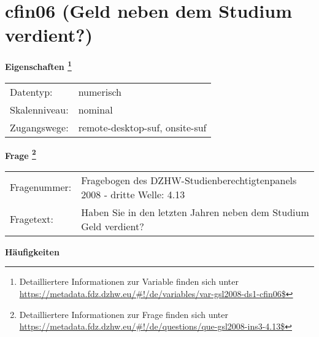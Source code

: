 
    \setcounter{footnote}{0}

    \vspace*{-1.8cm}
	\section{cfin06 (Geld neben dem Studium verdient?)}
	\label{section:cfin06}



    \vspace*{0.5cm}
    \noindent\textbf{Eigenschaften
	\footnote{Detailliertere Informationen zur Variable finden sich unter
		\url{https://metadata.fdz.dzhw.eu/\#!/de/variables/var-gsl2008-ds1-cfin06$}}}\\
	\begin{tabularx}{\hsize}{@{}lX}
	Datentyp: & numerisch \\
	Skalenniveau: & nominal \\
	Zugangswege: &
	  remote-desktop-suf, 
	  onsite-suf
 \\
    \end{tabularx}



				\vspace*{0.5cm}
                \noindent\textbf{Frage
	                \footnote{Detailliertere Informationen zur Frage finden sich unter
		              \url{https://metadata.fdz.dzhw.eu/\#!/de/questions/que-gsl2008-ins3-4.13$}}}\\
				\begin{tabularx}{\hsize}{@{}lX}
					Fragenummer: &
					  Fragebogen des DZHW-Studienberechtigtenpanels 2008 - dritte Welle:
					  4.13
 \\
					Fragetext: & Haben Sie in den letzten Jahren neben dem Studium Geld verdient? \\
				\end{tabularx}





        		\vspace*{0.5cm}
                \noindent\textbf{Häufigkeiten}


